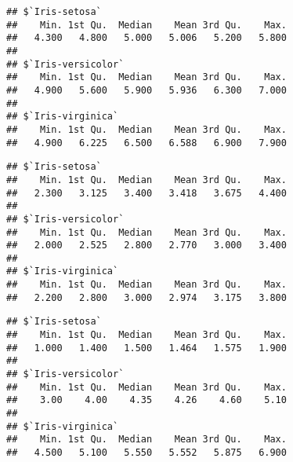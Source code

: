 \documentclass[
]{article}
\newenvironment{Shaded}{\begin{snugshade}}{\end{snugshade}}
\newcommand{\FunctionTok}[1]{\textcolor[rgb]{0.00,0.00,0.00}{#1}}
\newcommand{\NormalTok}[1]{#1}
\newcommand{\SpecialCharTok}[1]{\textcolor[rgb]{0.00,0.00,0.00}{#1}}
\begin{document}
\begin{verbatim}
## $`Iris-setosa`
##    Min. 1st Qu.  Median    Mean 3rd Qu.    Max. 
##   4.300   4.800   5.000   5.006   5.200   5.800 
## 
## $`Iris-versicolor`
##    Min. 1st Qu.  Median    Mean 3rd Qu.    Max. 
##   4.900   5.600   5.900   5.936   6.300   7.000 
## 
## $`Iris-virginica`
##    Min. 1st Qu.  Median    Mean 3rd Qu.    Max. 
##   4.900   6.225   6.500   6.588   6.900   7.900
\end{verbatim}

\begin{Shaded}
\end{Shaded}

\begin{verbatim}
## $`Iris-setosa`
##    Min. 1st Qu.  Median    Mean 3rd Qu.    Max. 
##   2.300   3.125   3.400   3.418   3.675   4.400 
## 
## $`Iris-versicolor`
##    Min. 1st Qu.  Median    Mean 3rd Qu.    Max. 
##   2.000   2.525   2.800   2.770   3.000   3.400 
## 
## $`Iris-virginica`
##    Min. 1st Qu.  Median    Mean 3rd Qu.    Max. 
##   2.200   2.800   3.000   2.974   3.175   3.800
\end{verbatim}

\begin{Shaded}
\end{Shaded}

\begin{verbatim}
## $`Iris-setosa`
##    Min. 1st Qu.  Median    Mean 3rd Qu.    Max. 
##   1.000   1.400   1.500   1.464   1.575   1.900 
## 
## $`Iris-versicolor`
##    Min. 1st Qu.  Median    Mean 3rd Qu.    Max. 
##    3.00    4.00    4.35    4.26    4.60    5.10 
## 
## $`Iris-virginica`
##    Min. 1st Qu.  Median    Mean 3rd Qu.    Max. 
##   4.500   5.100   5.550   5.552   5.875   6.900
\end{verbatim}

\begin{Shaded}
\end{Shaded}
\end{document}
